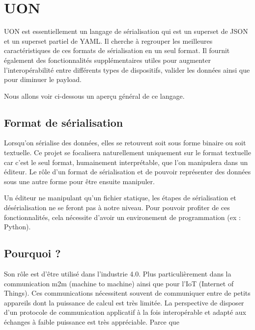 \documentclass[
    iict, %
    il, %
]{heig-tb}
\begin{document}
\section{UON}
UON est essentiellement un langage de sérialisation qui est un superset de JSON et un superset partiel de YAML.
Il cherche à regrouper les meilleures caractéristiques de ces formats de sérialisation en un seul format.
Il fournit également des fonctionnalités supplémentaires utiles pour augmenter l'interopérabilité entre différents types de dispositifs, valider les données ainsi que pour diminuer le payload.

Nous allons voir ci-dessous un aperçu général de ce langage.

\subsection{Format de sérialisation}

Lorsqu'on sérialise des données, elles se retouvent soit sous forme binaire ou soit textuelle.
Ce projet se focalisera naturellement uniquement sur le format textuelle car c'est le seul format, humainement interprétable, que l'on manipulera dans un éditeur.
Le rôle d'un format de sérialisation et de pouvoir représenter des données sous une autre forme pour être ensuite manipuler.

Un éditeur ne manipulant qu'un fichier statique, les étapes de sérialisation et désérialisation ne se feront pas à notre niveau.
Pour pouvoir profiter de ces fonctionnalités, cela nécessite d'avoir un environement de programmation (ex : Python).



\subsection{Pourquoi ?}
Son rôle est d'être utilisé dans l'industrie 4.0. Plus particulièrement dans la communication m2m (machine to machine) ainsi que pour l'IoT (Internet of Things).
Ces communications nécessitent souvent de communiquer entre de petits appareils dont la puissance de calcul est très limitée.
La perspective de disposer d'un protocole de communication applicatif à la fois interopérable et adapté aux échanges à faible puissance est très appréciable.
Parce que %
\end{document}
